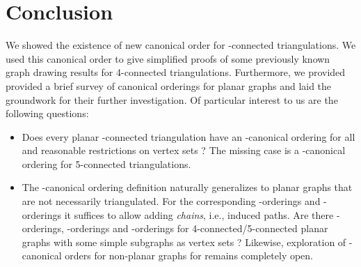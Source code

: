 \documentclass[12pt]{article}
\begin{document}
\section{Conclusion}
\label{se:concl}


We showed the existence of new canonical order for -connected triangulations. We used this canonical order to give simplified proofs of some previously known graph drawing results for 4-connected triangulations. 
Furthermore, we provided provided a brief survey of canonical  orderings for planar graphs and laid the groundwork for their further investigation.   Of particular interest to us are the following questions:
\begin{itemize}
\item Does every planar -connected triangulation have an -canonical ordering for all  and reasonable restrictions
	on vertex sets  ? 
The missing case is a -canonical ordering for 5-connected triangulations.

\item The -canonical ordering definition naturally generalizes to planar graphs that are not necessarily triangulated.
	For the corresponding -orderings \cite{Kant96} and -orderings \cite{NRN97}
	it suffices to allow adding {\em chains}, i.e., induced paths.  Are there -orderings, -orderings and -orderings 
	for 4-connected/5-connected planar graphs with some simple subgraphs as vertex sets ?  Likewise, exploration of
	-canonical orders for non-planar graphs for  remains completely open.
\end{itemize}
	
\end{document}

